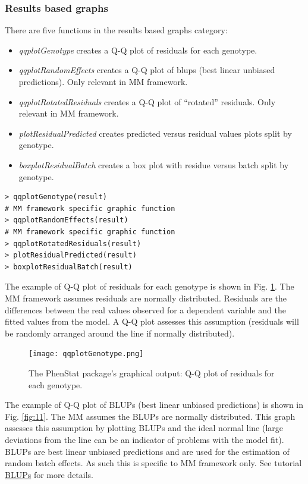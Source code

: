 \documentclass[12pt,a4paper]{article}
\begin{document}
\subsubsection{Results based graphs}
There are five functions in the results based graphs category:
\begin{itemize}
\item \textit{qqplotGenotype} creates a Q-Q plot of residuals for each genotype.
\item \textit{qqplotRandomEffects} creates a Q-Q plot of blups (best linear unbiased predictions). Only relevant in MM framework.
\item \textit{qqplotRotatedResiduals} creates a Q-Q plot of ``rotated'' residuals.  Only relevant in MM framework.
\item \textit{plotResidualPredicted} creates predicted versus residual values plots split by genotype.
\item \textit{boxplotResidualBatch} creates a box plot with residue versus batch split by genotype.
\end{itemize}


\begingroup
\fontsize{8pt}{12pt}\selectfont
\begin{verbatim}
> qqplotGenotype(result)
# MM framework specific graphic function 
> qqplotRandomEffects(result)
# MM framework specific graphic function 
> qqplotRotatedResiduals(result)
> plotResidualPredicted(result)
> boxplotResidualBatch(result)
\end{verbatim}
\endgroup 

The example of Q-Q plot of residuals for each genotype is shown in Fig. \ref{fig:10}. The MM framework assumes residuals are normally distributed. Residuals are the differences between the real values observed for a dependent variable and the fitted values from the model. A Q-Q plot assesses this assumption (residuals will be randomly arranged around the line if normally distributed). 
\begin{figure}[!tpb]%
\centerline{\texttt{[image: qqplotGenotype.png]}}
\caption{The PhenStat package's graphical output: Q-Q plot of residuals for each genotype.}\label{fig:10}
\end{figure}


The example of Q-Q plot of BLUPs (best linear unbiased predictions) is shown in Fig. \ref{fig:11}. The MM assumes the BLUPs are normally distributed. This graph assesses this assumption by plotting BLUPs and the ideal normal line (large deviations from the line can be an indicator of problems with the model fit). BLUPs are best linear unbiased predictions and are used for the estimation of random batch effects. As such this is specific to MM framework only. See tutorial \href{http://www.extension.org/pages/61006/the-solcap-tomato-phenotypic-data:-estimating-heritability-and-blups-for-traits#.Ui4zjWRgYXc}{BLUPs} for more details.
\end{document}
